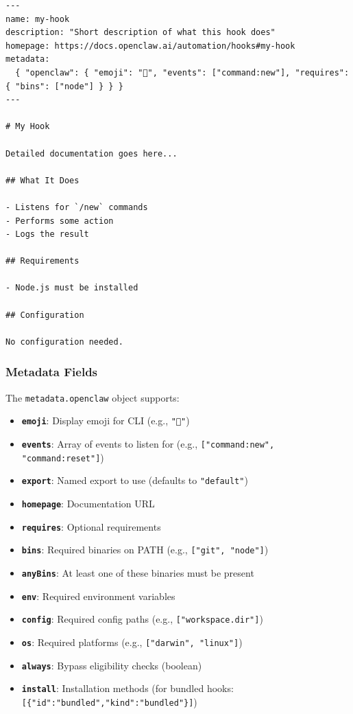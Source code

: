 \begin{lstlisting}
---
name: my-hook
description: "Short description of what this hook does"
homepage: https://docs.openclaw.ai/automation/hooks#my-hook
metadata:
  { "openclaw": { "emoji": "🔗", "events": ["command:new"], "requires": { "bins": ["node"] } } }
---

# My Hook

Detailed documentation goes here...

## What It Does

- Listens for `/new` commands
- Performs some action
- Logs the result

## Requirements

- Node.js must be installed

## Configuration

No configuration needed.
\end{lstlisting}


\subsubsection{Metadata Fields}


The \texttt{metadata.openclaw} object supports:

\begin{itemize}
  \item \textbf{\texttt{emoji}}: Display emoji for CLI (e.g., \texttt{"💾"})
  \item \textbf{\texttt{events}}: Array of events to listen for (e.g., \texttt{["command:new", "command:reset"]})
  \item \textbf{\texttt{export}}: Named export to use (defaults to \texttt{"default"})
  \item \textbf{\texttt{homepage}}: Documentation URL
  \item \textbf{\texttt{requires}}: Optional requirements
  \item \textbf{\texttt{bins}}: Required binaries on PATH (e.g., \texttt{["git", "node"]})
  \item \textbf{\texttt{anyBins}}: At least one of these binaries must be present
  \item \textbf{\texttt{env}}: Required environment variables
  \item \textbf{\texttt{config}}: Required config paths (e.g., \texttt{["workspace.dir"]})
  \item \textbf{\texttt{os}}: Required platforms (e.g., \texttt{["darwin", "linux"]})
  \item \textbf{\texttt{always}}: Bypass eligibility checks (boolean)
  \item \textbf{\texttt{install}}: Installation methods (for bundled hooks: \texttt{[\{"id":"bundled","kind":"bundled"\}]})
\end{itemize}


